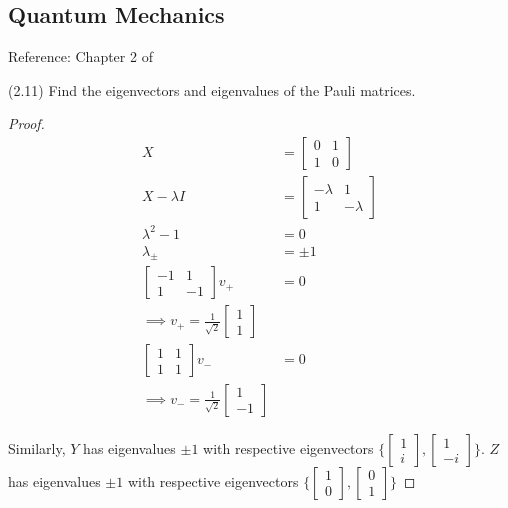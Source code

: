 \documentclass[main.tex]{subfiles}
\begin{document}
\maketitle

\begin{subappendices}
\section{Quantum Mechanics}
Reference: Chapter 2 of \cite{nielsen2010quantum}

\begin{exercise} (2.11) Find the eigenvectors and eigenvalues of the Pauli matrices. 

\begin{proof}
	\begin{align*}
	X &= \begin{bmatrix}
 0 & 1 \\ 1 & 0	
 \end{bmatrix} \\
 X - \lambda I &= \begin{bmatrix}
 -\lambda & 1 \\ 1 & -\lambda	
 \end{bmatrix} \\
 \lambda^2 - 1 &= 0 \\
 \lambda_{\pm} &= \pm 1 \\
 \begin{bmatrix}
 -1 & 1 \\ 1 & -1
 \end{bmatrix} v_+ &= 0 \\
 \implies v_+ = \frac{1}{\sqrt{2}}\begin{bmatrix}
 1 \\ 1
 \end{bmatrix} \\
 \begin{bmatrix}
 1 & 1 \\ 1 & 1
 \end{bmatrix} v_- &= 0 \\
 \implies v_- = \frac{1}{\sqrt{2}}\begin{bmatrix}
 1 \\ -1
 \end{bmatrix}
	\end{align*}

Similarly, $Y$ has eigenvalues $\pm 1$ with respective eigenvectors $\Big\{ \begin{bmatrix}
 1 \\ i
 \end{bmatrix} , \begin{bmatrix}
 1 \\ -i
 \end{bmatrix} \Big\}$. $Z$ has eigenvalues $\pm 1$ with respective eigenvectors $\Big\{ \begin{bmatrix}
 1 \\ 0
 \end{bmatrix} , \begin{bmatrix}
 0 \\ 1
 \end{bmatrix} \Big\}$
\end{proof}
	

\end{exercise}
\end{subappendices}
\end{document}
